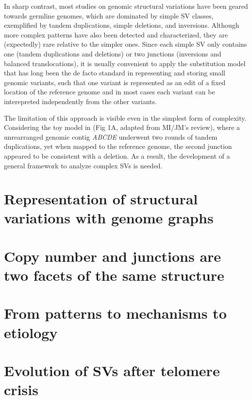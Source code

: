 \documentclass[phd,tocprelim]{cornell}
\begin{document}
In sharp contrast, most studies on genomic structural variations have been geared towards germline genomes, which are dominated by simple SV classes, exemplified by tandem duplications, simple deletions, and inversions. Although more complex patterns have also been detected and characterized, they are (expectedly) rare relative to the simpler ones. Since each simple SV only contains one (tandem duplications and deletions) or two junctions (inversions and balanced translocations), it is usually convenient to apply the substitution model that has long been the de facto standard in representing and storing small genomic variants, such that one variant is represented as an edit of a fixed location of the reference genome and in most cases each variant can be interepreted independently from the other variants.

The limitation of this approach is visible even in the simplest form of complexity. Considering the toy model in (Fig 1A, adapted from MI/JM's review), where a unrearranged genomic contig \textit{ABCDE} underwent two rounds of tandem duplications, yet when mapped to the reference genome, the second junction appeared to be consistent with a deletion. As a result, the development of a general framework to analyze complex SVs is needed. 

\section{Representation of structural variations with genome graphs}


\section{Copy number and junctions are two facets of the same structure}


\section{From patterns to mechanisms to etiology}

\section{Evolution of SVs after telomere crisis}

\end{document}
